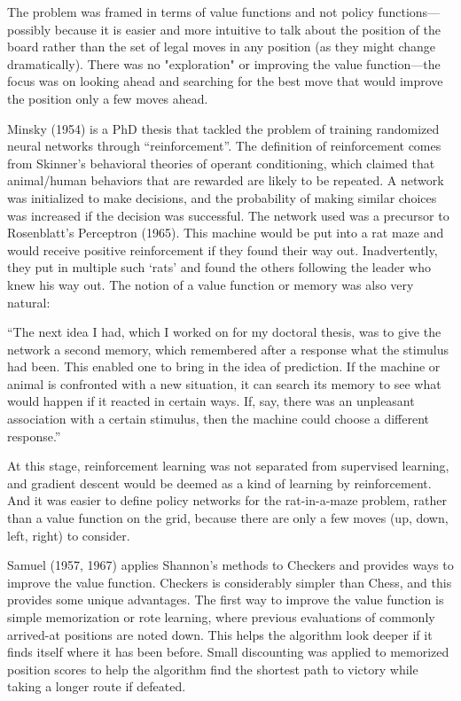 The problem was framed in terms of value functions and not policy functions—possibly because it is easier and more intuitive to talk about the position of the board rather than the set of legal moves in any position (as they might change dramatically). There was no "exploration" or improving the value function---the focus was on looking ahead and searching for the best move that would improve the position only a few moves ahead. 

Minsky (1954) is a PhD thesis that tackled the problem of training randomized neural networks through “reinforcement”. The definition of reinforcement comes from Skinner’s behavioral theories of operant conditioning, which claimed that animal/human behaviors that are rewarded are likely to be repeated. A network was initialized to make decisions, and the probability of making similar choices was increased if the decision was successful. The network used was a precursor to Rosenblatt’s Perceptron (1965). This machine would be put into a rat maze and would receive positive reinforcement if they found their way out. Inadvertently, they put in multiple such ‘rats’ and found the others following the leader who knew his way out. The notion of a value function or memory was also very natural:

“The next idea I had, which I worked on for my doctoral thesis, was to give the network a second memory, which remembered after a response what the stimulus had been. This enabled one to bring in the idea of prediction. If the machine or animal is confronted with a new situation, it can search its memory to see what would happen if it reacted in certain ways. If, say, there was an unpleasant association with a certain stimulus, then the machine could choose a different response.”

At this stage, reinforcement learning was not separated from supervised learning, and gradient descent would be deemed as a kind of learning by reinforcement. And it was easier to define policy networks for the rat-in-a-maze problem, rather than a value function on the grid, because there are only a few moves (up, down, left, right) to consider.  

Samuel (1957, 1967) applies Shannon's methods to Checkers and provides ways to improve the value function. Checkers is considerably simpler than Chess, and this provides some unique advantages. The first way to improve the value function is simple memorization or rote learning, where previous evaluations of commonly arrived-at positions are noted down. This helps the algorithm look deeper if it finds itself where it has been before. Small discounting was applied to memorized position scores to help the algorithm find the shortest path to victory while taking a longer route if defeated. 


